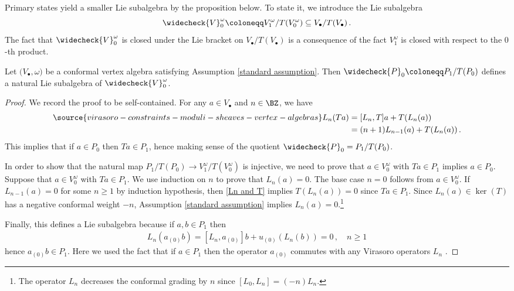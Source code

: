 Primary states yield a smaller Lie subalgebra by the proposition below. To state it, we introduce the Lie subalgebra
\[\widecheck{V}_0^\omega\coloneqq V_1^\omega/T(V_0^\omega)\subseteq V_\bullet/T(V_\bullet)\,.\]
The fact that $\widecheck{V}_0^\omega$ is closed under the Lie bracket on $V_\bullet/T(V_\bullet)$ is a consequence of the fact $V_1^\omega$ is closed with respect to the $0$-th product.
\begin{proposition}
\notready\label{prop: wallcrossingcompatibility1}
Let $\big(V_\bullet,\omega\big)$ be a conformal vertex algebra satisfying Assumption \ref{standard assumption}. Then $\widecheck{P}_0\coloneqq P_1/T(P_0)$ defines a natural Lie subalgebra of $\widecheck{V}_0^\omega$.
\end{proposition}
\begin{proof}
We record the proof to be self-contained. For any $a\in V_\bullet$ and $n\in \BZ$, we have
\begin{align}\label{Ln and T}
\source{virasoro-constraints-moduli-sheaves-vertex-algebras}
    L_n(Ta)
    &=[L_n, T]a+T(L_n(a))\\
    &=(n+1)L_{n-1}(a)+T(L_n(a))\,.\nonumber
\end{align}
This implies that if $a\in P_0$ then $Ta\in P_1$, hence making sense of the quotient $\widecheck{P}_0=P_1/T(P_0)$.

In order to show that the natural map $P_1/T(P_0)\rightarrow V_1^\omega/T(V_0^\omega)$ is injective, we need to prove that $a\in V_0^\omega$ with $Ta\in P_1$ implies $a\in P_0$. Suppose that $a\in V_0^\omega$ with $Ta\in P_1$. We use induction on $n$ to prove that $L_n(a)=0$. The base case $n=0$ follows from $a\in V_0^\omega$. If $L_{n-1}(a)=0$ for some $n\geq 1$ by induction hypothesis, then \eqref{Ln and T} implies $T(L_n(a))=0$ since $Ta\in P_1$. Since $L_n(a)\in \ker(T)$ has a negative conformal weight $-n$, Assumption \ref{standard assumption} implies $L_n(a)=0$.\footnote{The operator $L_n$ decreases the conformal grading by $n$ since $[L_0,L_n]=(-n)L_n$. }

Finally, this defines a Lie subalgebra because if $a, b\in P_1$ then
\begin{align*}
    L_n(a_{(0)}b)=[L_n, a_{(0)}]b+u_{(0)}(L_n(b))=0\,,\quad n\geq 1
\end{align*}
hence $a_{(0)}b\in P_1$. Here we used the fact that if $a\in P_1$ then the operator $a_{(0)}$ commutes with any Virasoro operators $L_n$ \cite[Section 5]{Borcherds}.
\end{proof}

